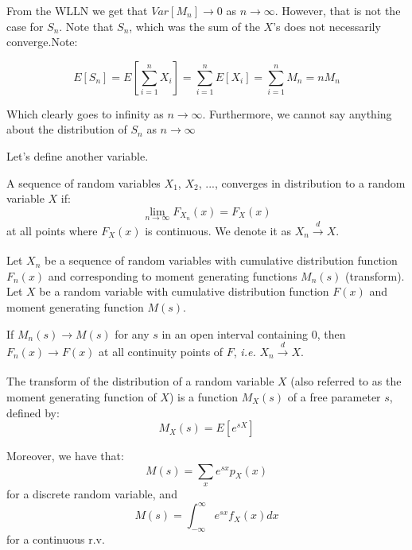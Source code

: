 \documentclass[aspectratio=169]{beamer}
\begin{document}
\begin{frame}
    From the WLLN we get that $Var[M_n]\rightarrow 0$ as $n\rightarrow\infty$. However, that is not the case for $S_n$. Note that $S_n$, which was the sum of the $X$'s does not necessarily converge.\pause Note:

    \vspace*{2em}

    $$E[S_n]=E\left[\sum_{i=1}^n X_i\right]=\sum_{i=1}^n E\left[ X_i\right]=\sum_{i=1}^n M_n=nM_n$$

    Which clearly goes to infinity as $n\rightarrow\infty$. Furthermore, we cannot say anything about the distribution of $S_n$ as $n\rightarrow\infty$

    \vspace*{2em}
    
    Let's define another variable.

\end{frame}

\begin{frame}
    \begin{definition}
        A sequence of random variables $X_1$, $X_2$, ..., converges in distribution to  a random variable $X$ if:
        \[\lim_{n\rightarrow\infty} F_{X_n}(x)=F_X(x)\]
        at all points where $F_X(x)$ is continuous.
        We denote it as $X_n\xrightarrow[]{d} X$.
    \end{definition}
\end{frame}

\begin{frame}
    \begin{theorem}
        Let $X_n$ be a sequence of random variables with cumulative distribution function $F_n(x)$ and corresponding to moment generating functions $M_n(s)$ (transform). Let $X$ be a random variable with cumulative distribution function $F(x)$ and
        moment generating function $M(s)$.
        
        \vspace{1em}
        
        If $M_n(s)\rightarrow M(s)$ for any $s$ in an open interval containing $0$, then $F_n(x)\rightarrow F(x)$ at all continuity points of $F$, \textit{i.e.} $X_n\xrightarrow[]{d} X$.
    \end{theorem}
    
\end{frame}

\begin{frame}
    \begin{definition}[Transform]
        The transform of the distribution of a random variable $X$ (also referred to as the moment generating function of $X$) is a function $M_X(s)$ of a free parameter $s$, defined by:
        \[M_X(s)=E\left[e^{sX}\right]\]
    \end{definition}
    Moreover, we have that:
    \[M(s)=\sum_{x}e^{sx}p_X(x)\] for a discrete random variable, and \[M(s)=\int_{-\infty}^{\infty}e^{sx}f_X(x)dx\] for a continuous r.v.
\end{frame}
\end{document}
